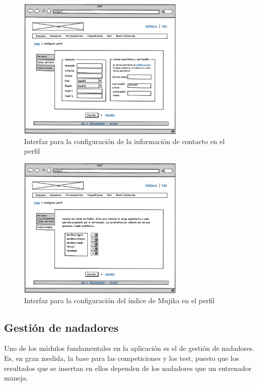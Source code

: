 		\begin{figure}[H]
		  \centering
		    \includegraphics[width=8cm]{./eps/p_interfaz/8_Conf_contacto.eps}
		  \caption{Interfaz para la configuración de la información de contacto en el perfil}
		  \label{fig:interfaz_conf_contacto}
		\end{figure}
		
		\begin{figure}[H]
		  \centering
		    \includegraphics[width=8cm]{./eps/p_interfaz/9_Conf_mujika.eps}
		  \caption{Interfaz para la configuración del índice de Mujika en el perfil}
		  \label{fig:interfaz_conf_mujika}
		\end{figure}
		
	
	\subsection{Gestión de nadadores} %
		\label{sub:gestion_de_nadadores}
	
	Uno de los módulos fundamentales en la aplicación es el de gestión de nadadores. Es, en gran medida, la base para las competiciones y los test, puesto que los resultados que se insertan en ellos dependen de los nadadores que un entrenador maneja. 
	
